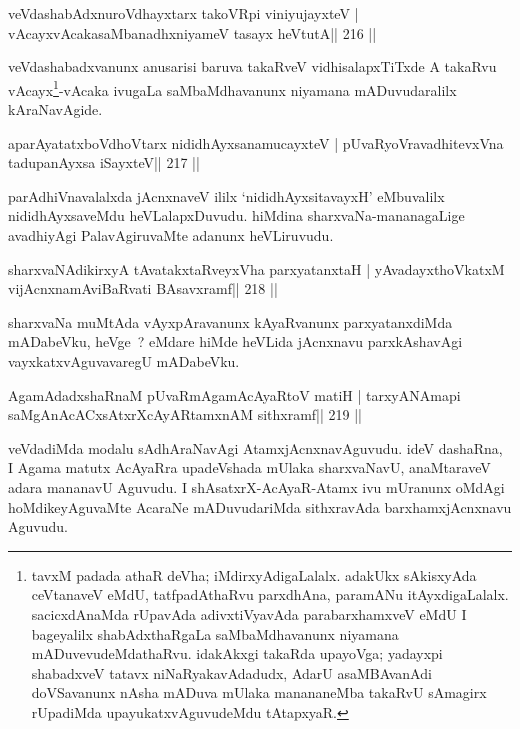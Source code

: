 \begin{shl}
veVdashabAdxnuroVdhayxtarx takoVR\s pi viniyujayxteV |
vAcayxvAcakasaMbanadhxniyameV tasayx heVtutA\hfill || 216 ||
\end{shl}

\begin{artha}
veVdashabadxvanunx anusarisi baruva takaRveV vidhisalapxTiTxde A takaRvu vAcayx\footnote{tavxM padada athaR deVha; iMdirxyAdigaLalalx. adakUkx sAkisxyAda ceVtanaveV eMdU, tatfpadAthaRvu parxdhAna, paramANu itAyxdigaLalalx. sacicxdAnaMda rUpavAda adivxtiVyavAda parabarxhamxveV eMdU I bageyalilx shabAdxthaRgaLa saMbaMdhavanunx niyamana mADuvevudeMdathaRvu. idakAkxgi takaRda upayoVga; yadayxpi shabadxveV tatavx niNaRyakavAdadudx, AdarU asaMBAvanAdi doVSavanunx nAsha mADuva mUlaka manananeMba takaRvU sAmagirx rUpadiMda upayukatxvAguvudeMdu tAtapxyaR.}-vAcaka ivugaLa saMbaMdhavanunx niyamana mADuvudaralilx kAraNavAgide.
\end{artha}

\begin{shl}
aparAyatatxboVdhoV\s tarx nididhAyxsanamucayxteV |
pUvaRyoVravadhitevxVna tadupanAyxsa iSayxteV\hfill || 217 ||
\end{shl}

\begin{artha}
parAdhiVnavalalxda jAcnxnaveV ililx `nididhAyxsitavayxH' eMbuvalilx nididhAyxsaveMdu heVLalapxDuvudu. hiMdina sharxvaNa-mananagaLige avadhiyAgi PalavAgiruvaMte adanunx heVLiruvudu.
\end{artha}

\begin{shl}
sharxvaNAdikirxyA tAvatakxtaRveyxVha parxyatanxtaH |
yAvadayxthoVkatxM vijAcnxnamAviBaRvati BAsavxramf\hfill || 218 ||
\end{shl}

\begin{artha}
sharxvaNa muMtAda vAyxpAravanunx kAyaRvanunx parxyatanxdiMda mADabeVku, heVge~? eMdare hiMde heVLida jAcnxnavu parxkAshavAgi vayxkatxvAguvavaregU mADabeVku.
\end{artha}


\begin{shl}
AgamAdadxshaRnaM pUvaRmAgamAcAyaRtoV matiH |
tarxyANAmapi saMgAnAcACxsAtxrXcAyARtamxnAM sithxramf\hfill || 219 ||
\end{shl}

\begin{artha}
veVdadiMda modalu sAdhAraNavAgi AtamxjAcnxnavAguvudu. ideV dashaRna, I Agama matutx AcAyaRra upadeVshada mUlaka sharxvaNavU, anaMtaraveV adara mananavU Aguvudu. I shAsatxrX-AcAyaR-Atamx ivu mUranunx oMdAgi hoMdikeyAguvaMte AcaraNe mADuvudariMda sithxravAda barxhamxjAcnxnavu Aguvudu.
\end{artha}

